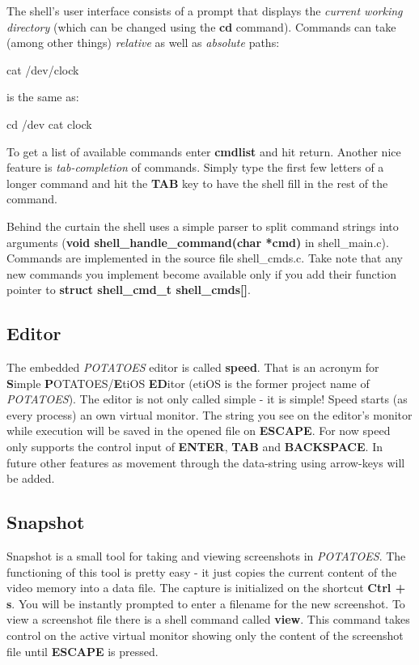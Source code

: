 \documentclass[11pt,a4paper]{scrartcl}
\begin{document}
The shell's user interface consists of a prompt that displays the \textit{current working directory} (which can be changed using the \textbf{cd} command). Commands can take (among other things) \textit{relative} as well as \textit{absolute} paths:

\begin{code}[]
cat /dev/clock
\end{code}

is the same as:

\begin{code}[]
cd /dev
cat clock
\end{code}

To get a list of available commands enter \textbf{cmdlist} and hit return. Another nice feature is \textit{tab-completion} of commands. Simply type the first few letters of a longer command and hit the \textbf{TAB} key to have the shell fill in the rest of the command.

Behind the curtain the shell uses a simple parser to split command strings into arguments (\textbf{void shell\_handle\_command(char *cmd)} in shell\_main.c). Commands are implemented in the source file shell\_cmds.c. Take note that any new commands you implement become available only if you add their function pointer to \textbf{struct shell\_cmd\_t shell\_cmds[]}.

\subsection{Editor}

The embedded \textit{POTATOES} editor is called \textbf{speed}. That is an acronym for \textbf{S}imple \textbf{P}OTATOES/\textbf{E}tiOS \textbf{ED}itor (etiOS is the former project name of \textit{POTATOES}). The editor is not only called simple - it is simple! Speed starts (as every process) an own virtual monitor. The string you see on the editor's monitor while execution will be saved in the opened file on \textbf{ESCAPE}. For now speed only supports the control input of \textbf{ENTER}, \textbf{TAB} and \textbf{BACKSPACE}. In future other features as movement through the data-string using arrow-keys will be added.

\subsection{Snapshot}
Snapshot is a small tool for taking and viewing screenshots in \textit{POTATOES}. The 	functioning of this tool is pretty easy - it just copies the current content of the video memory into a data file. The capture is initialized on the shortcut \textbf{Ctrl + s}. You will be instantly prompted to enter a filename for the new screenshot. To view a screenshot file there is a shell command called \textbf{view}. This command takes control on the active virtual monitor showing only the content of the screenshot file until \textbf{ESCAPE} is pressed.
\end{document}
